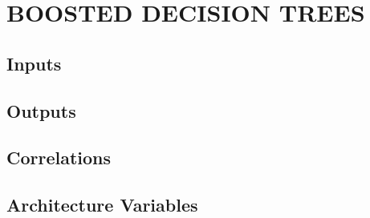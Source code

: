 %
%
%
%


\chapter{\texorpdfstring{\uppercase{Boosted Decision Trees}}{Boosted Decision Trees}}

\section{Inputs}
\section{Outputs}
\section{Correlations}
\section{Architecture Variables}

